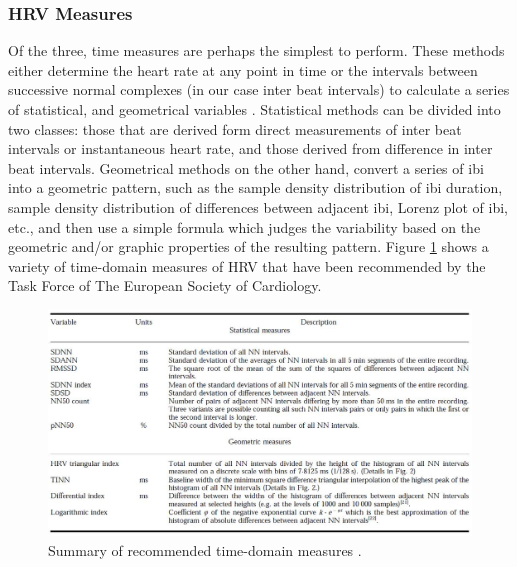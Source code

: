 \subsubsection{HRV Measures}
Of the three, time measures are perhaps the simplest to perform. These methods either determine the heart rate at any point in time or the intervals between successive normal complexes (in our case inter beat intervals) to calculate a series of statistical, and geometrical variables \cite{TheEuropeanSocietyofCardiology1996}. 
Statistical methods can be divided into two classes: those that are derived form direct measurements of inter beat intervals or instantaneous heart rate, and those derived from difference in inter beat intervals. Geometrical methods on the other hand, convert a series of \gls{ibi} into a geometric pattern, such as the sample density distribution of \gls{ibi} duration, sample density distribution of differences between adjacent \gls{ibi}, Lorenz plot of \gls{ibi}, etc., and then use a simple formula which judges the variability based on the geometric and/or graphic properties of the resulting pattern\cite{TheEuropeanSocietyofCardiology1996}.
\newpage 
Figure \ref{tdf} shows a variety of time-domain measures of HRV that have been recommended by the Task Force of The European Society of Cardiology.\\

\begin{figure}[ht]
	\centering
  \includegraphics[width=1.0\textwidth, angle=0]{images/SelectedTimeDomainMeasures.jpg}
	\caption[HRV Time-Domain Measures Recommendation]{Summary of recommended time-domain measures \cite{TheEuropeanSocietyofCardiology1996}. }
	\label{tdf}
\end{figure}

